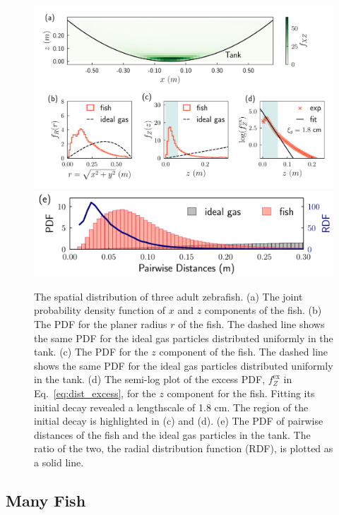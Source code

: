 \documentclass[11pt,twoside]{report}
\begin{document}
\begin{figure}
  \includegraphics[width=\linewidth]{density-three-fish}
  \includegraphics[width=0.9\linewidth, outer]{pdist-3fish}
  \caption[The 3D spatial distribution of three fish]{
  The spatial distribution of three adult zebrafish. 
  (a) The joint probability density function of $x$ and $z$ components of the fish.
  (b) The PDF for the planer radius $r$ of the fish. The dashed line shows the same PDF for the ideal gas particles distributed uniformly in the tank.
  (c) The PDF for the $z$ component of the fish. The dashed line shows the same PDF for the ideal gas particles distributed uniformly in the tank.
  (d) The semi-log plot of the excess PDF, $f_Z^\mathrm{ex}$ in Eq.~\ref{eq:dist_excess}, for the $z$ component for the fish. Fitting its initial decay revealed a lengthscale of 1.8 cm. The region of the initial decay is highlighted in (c) and (d).
  (e) The PDF of pairwise distances of the fish and the ideal gas particles in the tank. The ratio of the two, the radial distribution function (RDF), is plotted as a solid line.
  }
  \label{fig:density_3d_fish_3}
\end{figure}


\subsection{Many Fish}
\label{section:fish_many_3d}
\end{document}
